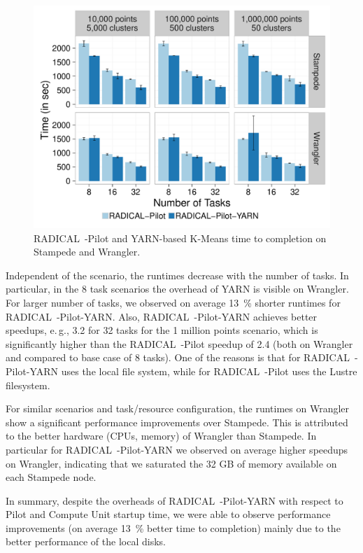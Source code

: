 \begin{figure}[t]
    \centering
    \includegraphics[width=.75\textwidth]{figures/data_analytics_hpc/hpc_hadoop/kmeans.pdf}
    \caption{RADICAL~-Pilot and YARN-based K-Means time to completion on Stampede and Wrangler.}
    \label{fig:experiments_kmeans_rpyarnkmeans}
\end{figure}

Independent of the scenario, the runtimes decrease with the number of tasks.
In particular, in the 8 task scenarios the overhead of YARN is visible on Wrangler.
For larger number of tasks, we observed on average 13~\% shorter runtimes for RADICAL~-Pilot-YARN.
Also, RADICAL~-Pilot-YARN achieves better speedups, e.\,g., 3.2 for 32 tasks for the 1 million points scenario, which is significantly higher than the RADICAL~-Pilot speedup of 2.4 (both on Wrangler and compared to base case of 8 tasks).
One of the reasons is that for RADICAL~-Pilot-YARN uses the local file system, while for RADICAL~-Pilot uses the Lustre filesystem.

For similar scenarios and task/resource configuration, the runtimes on Wrangler show a significant performance improvements over Stampede.
This is attributed to the better hardware (CPUs, memory) of Wrangler than Stampede.
In particular for RADICAL~-Pilot-YARN we observed on average higher speedups on Wrangler, indicating that we saturated the 32 GB of memory available on each Stampede node.

In summary, despite the overheads of RADICAL~-Pilot-YARN with respect to Pilot and Compute Unit startup time, we were able to observe performance improvements (on average 13~\% better time to completion) mainly due to the better performance of the local disks.


